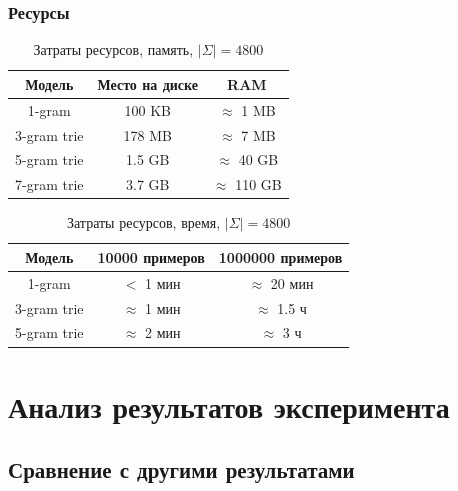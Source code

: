 \documentclass[aspectratio=169, pdf, 9pt, utf8]{beamer}
\begin{document}
\begin{frame}
	\frametitle{Ресурсы}
	
	
	\begin{table}[H]
		\begin{center}
			\begin{tabular}{|c|c|c|} \hline
				Модель & Место на диске & RAM \\ \hline
				1-gram & 100 KB & $\approx$ 1 MB \\
				3-gram trie &  178 MB & $\approx$ 7 MB \\
				5-gram trie &  1.5 GB & $\approx$ 40 GB \\
				7-gram trie & 3.7 GB & $\approx$ 110 GB \\ \hline
			\end{tabular}
			\caption{Затраты ресурсов, память, $|\Sigma| = 4800$}
			\label{table:resmem}
		\end{center}
	\end{table}
	
	\begin{table}[H]
		\begin{center}
			\begin{tabular}{|c|c|c|} \hline
				Модель & 10000 примеров & 1000000 примеров \\ \hline
				1-gram & $<$ 1 мин & $\approx$ 20 мин \\
				3-gram trie &  $\approx$ 1 мин  & $\approx$ 1.5 ч \\
				5-gram trie &  $\approx$ 2 мин & $\approx$ 3 ч \\ \hline
			\end{tabular}
			\caption{Затраты ресурсов, время, $|\Sigma| = 4800$}
			\label{table:restime}
		\end{center}
	\end{table}
\end{frame}
\section{ Анализ результатов эксперимента }

\subsection{ Сравнение с другими результатами }
\end{document}
